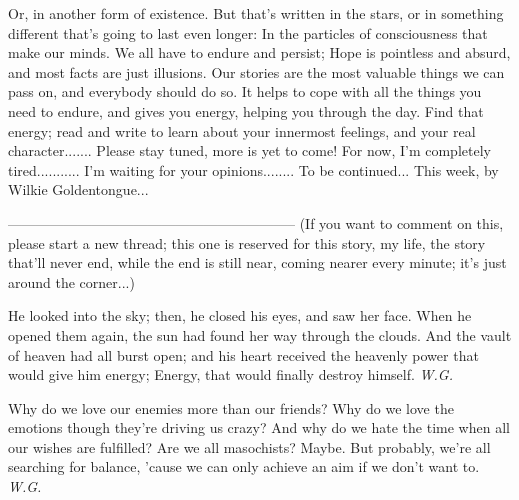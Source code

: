 Or, in another form of existence. 
But that's written in the stars, or in something different that's going to last even longer: In the particles of consciousness that make our minds. 
We all have to endure and persist; Hope is pointless and absurd, and most facts are just illusions. 
Our stories are the most valuable things we can pass on, and everybody should do so. 
It helps to cope with all the things you need to endure, and gives you energy, helping you through the day. 
Find that energy; read and write to learn about your innermost feelings, and your real character.......
Please stay tuned, more is yet to come!
For now, I'm completely tired...........
I'm waiting for your opinions........
To be continued...
This week, by Wilkie Goldentongue...

--------------------------------------------------------------
(If you want to comment on this, please start a new thread; this one is reserved for this story, my life, the story that'll never end, while the end is still near, coming nearer every minute; it's just around the corner...)

He looked into the sky; 
then, he closed his eyes, 
and saw her face. 
When he opened them again, 
the sun had found her way 
through the clouds. 
And the vault of heaven 
had all burst open; 
and his heart received 
the heavenly power 
that would give him energy; 
Energy, that would finally 
destroy himself. 
\emph{W.G.}

Why do we love our enemies more than our friends? 
Why do we love the emotions though they're driving us crazy? 
And why do we hate the time when all our wishes are fulfilled? 
Are we all masochists?
Maybe. 
But probably, we're all searching for balance, 
'cause we can only achieve an aim
if we don't want to. 
\emph{W.G.}
